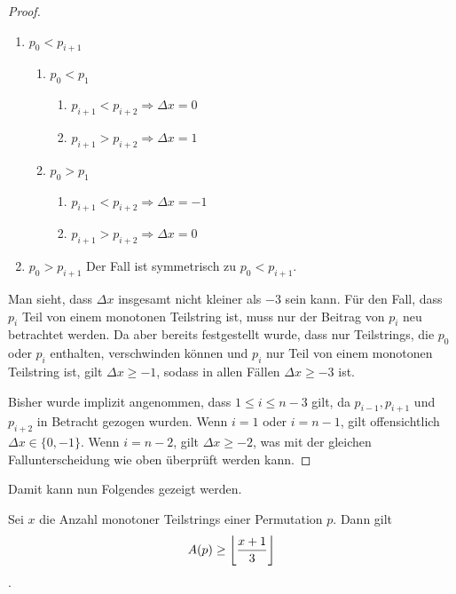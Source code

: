 \documentclass[a4paper, 11pt, ngerman]{article}
\begin{document}
\begin{proof}
    \begin{enumerate}
        \item $p_0 < p_{i + 1}$
              \begin{enumerate}
                  \item $p_0 < p_1$
                        \begin{enumerate}
                            \item $p_{i + 1} < p_{i + 2} \Longrightarrow \Delta x = 0$
                            \item $p_{i + 1} > p_{i + 2} \Longrightarrow \Delta x = 1$
                        \end{enumerate}
                  \item $p_0 > p_1$
                        \begin{enumerate}
                            \item $p_{i + 1} < p_{i + 2} \Longrightarrow \Delta x = -1$
                            \item $p_{i + 1} > p_{i + 2} \Longrightarrow \Delta x = 0$
                        \end{enumerate}
              \end{enumerate}
        \item $p_0 > p_{i + 1}$ Der Fall ist symmetrisch zu $p_0 < p_{i + 1}$.
    \end{enumerate}

    \noindent Man sieht, dass $\Delta x$ insgesamt nicht kleiner als $-3$ sein kann. Für den Fall, dass $p_i$ Teil von einem monotonen Teilstring ist, muss nur der Beitrag von $p_i$ neu betrachtet werden. Da aber bereits festgestellt wurde, dass nur Teilstrings, die $p_0$ oder $p_i$ enthalten, verschwinden können und $p_i$ nur Teil von einem monotonen Teilstring ist, gilt $\Delta x \ge -1$, sodass in allen Fällen $\Delta x \ge - 3$ ist.

    Bisher wurde implizit angenommen, dass $1 \le i \le n - 3$ gilt, da $p_{i-1}, p_{i + 1}$ und $p_{i + 2}$ in Betracht gezogen wurden. Wenn $i = 1$ oder $i = n - 1$, gilt offensichtlich $\Delta x \in \{0, -1\}$. Wenn $i = n - 2$, gilt $\Delta x \ge -2$, was mit der gleichen Fallunterscheidung wie oben überprüft werden kann.
\end{proof}

Damit kann nun Folgendes gezeigt werden.

\begin{theorem}
    Sei $x$ die Anzahl monotoner Teilstrings einer Permutation $p$. Dann gilt
    $$ A(p) \ge \bigg{\lfloor} \frac {x + 1} 3 \bigg{\rfloor} $$.
\end{theorem}
\end{document}
